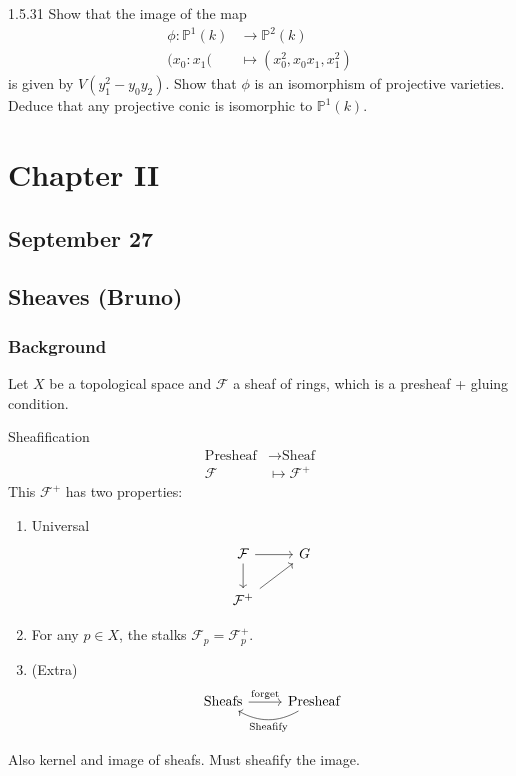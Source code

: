 \begin{manualexercise}{1.5.31}
	Show that the image of the map
	\begin{align*}
		\phi: \mathbb{P}^{1}(k) &\longrightarrow \mathbb{P}^{2}(k) \\
		(x_0:x_1( &\longmapsto (x_0^{2},x_0x_1,x_1^{2})
	\end{align*}
	is given by $V(y_1^{2}-y_0y_2)$. Show that $\phi$ is an isomorphism of projective varieties. Deduce that any projective conic is isomorphic to $\mathbb{P}^{1}(k)$.
\end{manualexercise}
\fi

\chapter{Chapter II}

\section{September 27}

\section{Sheaves (Bruno)}

\subsection{Background}
Let $X$ be a topological space and $\mathcal{F}$ a sheaf of rings, which is a presheaf + gluing condition.

\begin{thing2}{Sheafification}\leavevmode
	 \begin{align*}
	 	\text{Presheaf}  &\longrightarrow \text{Sheaf}  \\
	 	\mathcal{F} &\longmapsto \mathcal{F}^+
	 \end{align*}
 This $\mathcal{F}^+$ has two properties:
 \begin{enumerate}
 	\item Universal
		\[\begin{tikzcd}
			\mathcal{F}\arrow[r]\arrow[d]& G\\
		\mathcal{F}^+\arrow[ur]
		\end{tikzcd}\]
		
 \item For any $p\in X$, the stalks $\mathcal{F}_{p}=\mathcal{F}_{p}^+$.
 \item (Extra)
	 \[\begin{tikzcd}
	 	\text{Sheafs}\arrow[r,"\text{forget}" ]&\text{Presheaf}\arrow[l,bend left,"\text{Sheafify}" ]  
	 \end{tikzcd}\]
 \end{enumerate}
\end{thing2}
	 \begin{remark}
	 Also kernel and image of sheafs. Must sheafify the image.	
	 \end{remark}
	 
